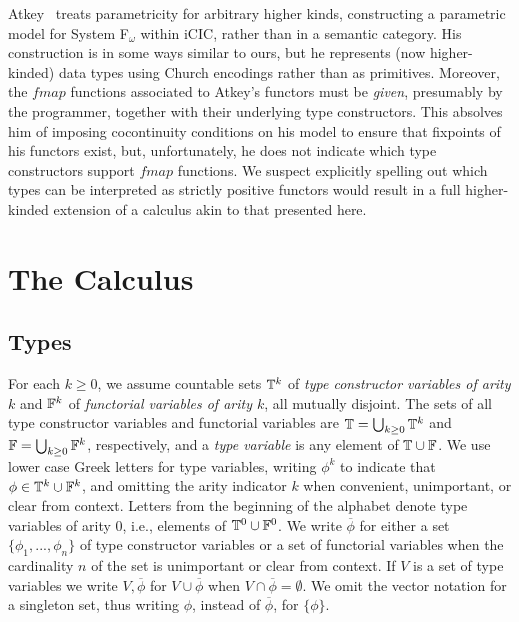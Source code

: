 \documentclass{lmcs}
\theoremstyle{plain}\newtheorem{satz}[thm]{Satz}
\begin{document}
Atkey~\cite{atk12} treats parametricity for arbitrary higher kinds,
constructing a parametric model for System F$_\omega$ within iCIC,
rather than in a semantic category. His construction is in some ways
similar to ours, but he represents (now higher-kinded) data types
using Church encodings rather than as primitives. Moreover, the
$\mathit{fmap}$ functions associated to Atkey's functors must be {\em
  given}, presumably by the programmer, together with their underlying
type constructors. This absolves him of imposing cocontinuity
conditions on his model to ensure that fixpoints of his functors
exist, but, unfortunately, he does not indicate which type
constructors support $\mathit{fmap}$ functions. We suspect explicitly
spelling out which types can be interpreted as strictly positive
functors would result in a full higher-kinded extension of a calculus
akin to that presented here.

\section{The Calculus}\label{sec:calculus}

\subsection{Types}
For each $k \ge 0$, we assume countable sets $\mathbb{T}^k$ of \emph{type
  constructor variables of arity $k$} and $\mathbb{F}^k$ of
\emph{functorial variables of arity $k$}, all mutually disjoint.  The
sets of all type constructor variables and functorial variables are
$\mathbb{T} = \bigcup_{k \ge 0} \mathbb{T}^k$ and $\mathbb{F} = \bigcup_{k \ge 0}
\mathbb{F}^k$, respectively, and a \emph{type variable} is any element of
$\mathbb{T} \cup \mathbb{F}$.  We use lower case Greek letters for type
variables, writing $\phi^k$ to indicate that $\phi \in \mathbb{T}^k \cup
\mathbb{F}^k$, and omitting the arity indicator $k$ when convenient,
unimportant, or clear from context. Letters from the beginning of the
alphabet denote type variables of arity $0$, i.e., elements of
$\mathbb{T}^0 \cup \mathbb{F}^0$. We write $\overline{\phi}$ for either a set
$\{\phi_1,...,\phi_n\}$ of type constructor variables or a set of
functorial variables when the cardinality $n$ of the set is
unimportant or clear from context. If $V$ is a set of type variables
we write $V, \overline{\phi}$ for $V \cup \overline{\phi}$ when $V
\cap \overline{\phi} = \emptyset$.  We omit the vector notation for a
singleton set, thus writing $\phi$, instead of $\overline{\phi}$, for
$\{\phi\}$.
\end{document}
